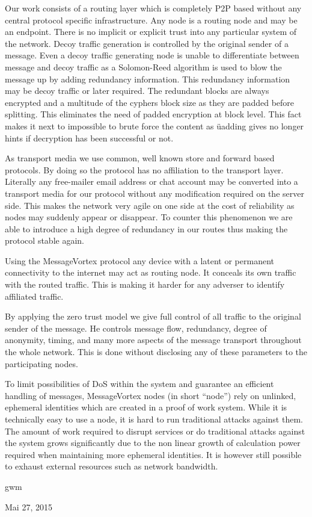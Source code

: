 \documentclass[9pt,journal,compsoc]{IEEEtran}
\begin{document}
Our work consists of a routing layer which is completely P2P based without any central protocol specific infrastructure. Any node is a routing node and may be an endpoint. There is no implicit or explicit trust into any particular system of the  network. Decoy traffic generation is controlled by the original sender of a message. Even a decoy traffic generating node is unable to differentiate between message and decoy traffic as a Solomon-Reed algorithm is used to blow the message up by adding redundancy information. This redundancy information may be decoy traffic or later required. The redundant blocks are always encrypted and a multitude of the cyphers block size as they are padded before splitting. This eliminates the need of padded encryption at block level. This fact makes it next to impossible to brute force the content as üadding gives no longer hints if decryption has been successful or not.

As transport media we use common, well known store and forward based protocols. By doing so the protocol has no affiliation to the transport layer. Literally any free-mailer email address or chat account may be converted into a transport media for our protocol without any modification required on the server side. This makes the network very agile on one side at the cost of reliability as nodes may suddenly appear or disappear. To counter this phenomenon we are able to introduce a high degree of redundancy in our routes thus making the protocol stable again.

Using the MessageVortex protocol any device with a latent or permanent connectivity to the internet may act as routing node. It conceals its own traffic with the routed traffic. This is making it harder for any adverser to identify affiliated traffic. 

By applying the zero trust model we give full control of all traffic to the original sender of the message. He controls message flow, redundancy, degree of anonymity, timing, and many more aspects of the message transport throughout the whole network. This is done without disclosing any of these parameters to the participating nodes.

To limit possibilities of DoS within the system and guarantee an efficient handling of messages, MessageVortex nodes (in short ``node'') rely on unlinked, ephemeral identities which are created in a proof of work system. While it is technically easy to use a node, it is hard to run traditional attacks against them. The amount of work required to disrupt services or do traditional attacks against the system grows significantly due to the non linear growth of calculation power required when maintaining more ephemeral identities. It is however still possible to exhaust external resources such as network bandwidth.\par\nopagebreak
\ifCLASSOPTIONpeerreview
\else
\hfill gwm\par\nopagebreak
\hfill Mai 27, 2015
\fi
\end{document}
